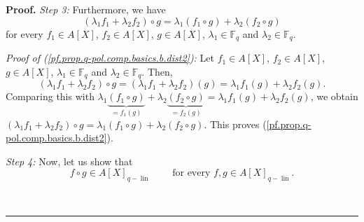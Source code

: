 \documentclass[numbers=enddot,12pt,final,onecolumn,notitlepage]{scrartcl}%
\theoremstyle{definition}
\newenvironment{proof}[1][Proof]{\noindent\textbf{#1.} }{\ \rule{0.5em}{0.5em}}
\begin{document}
\begin{proof}
\textit{Step 3:} Furthermore, we have%
\begin{equation}
\left(  \lambda_{1}f_{1}+\lambda_{2}f_{2}\right)  \circ g=\lambda_{1}\left(
f_{1}\circ g\right)  +\lambda_{2}\left(  f_{2}\circ g\right)
\label{pf.prop.q-pol.comp.basics.b.dist2}%
\end{equation}
for every $f_{1}\in A\left[  X\right]  $, $f_{2}\in A\left[  X\right]  $,
$g\in A\left[  X\right]  $, $\lambda_{1}\in\mathbb{F}_{q}$ and $\lambda_{2}%
\in\mathbb{F}_{q}$.

\textit{Proof of (\ref{pf.prop.q-pol.comp.basics.b.dist2}):} Let $f_{1}\in
A\left[  X\right]  $, $f_{2}\in A\left[  X\right]  $, $g\in A\left[  X\right]
$, $\lambda_{1}\in\mathbb{F}_{q}$ and $\lambda_{2}\in\mathbb{F}_{q}$. Then,%
\[
\left(  \lambda_{1}f_{1}+\lambda_{2}f_{2}\right)  \circ g=\left(  \lambda
_{1}f_{1}+\lambda_{2}f_{2}\right)  \left(  g\right)  =\lambda_{1}f_{1}\left(
g\right)  +\lambda_{2}f_{2}\left(  g\right)  .
\]
Comparing this with $\lambda_{1}\underbrace{\left(  f_{1}\circ g\right)
}_{=f_{1}\left(  g\right)  }+\lambda_{2}\underbrace{\left(  f_{2}\circ
g\right)  }_{=f_{2}\left(  g\right)  }=\lambda_{1}f_{1}\left(  g\right)
+\lambda_{2}f_{2}\left(  g\right)  $, we obtain $\left(  \lambda_{1}%
f_{1}+\lambda_{2}f_{2}\right)  \circ g=\lambda_{1}\left(  f_{1}\circ g\right)
+\lambda_{2}\left(  f_{2}\circ g\right)  $. This proves
(\ref{pf.prop.q-pol.comp.basics.b.dist2}).

\textit{Step 4:} Now, let us show that%
\begin{equation}
f\circ g\in A\left[  X\right]  _{q-\operatorname*{lin}}%
\ \ \ \ \ \ \ \ \ \ \text{for every }f,g\in A\left[  X\right]
_{q-\operatorname*{lin}}. \label{pf.prop.q-pol.comp.basics.b.closed}%
\end{equation}



\end{proof}
\end{document}
